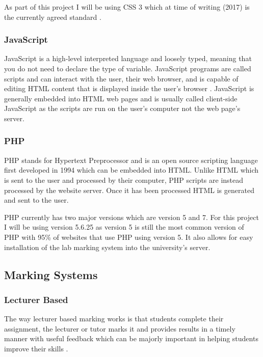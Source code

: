 \documentclass[12pt]{article}  %
\begin{document}
As part of this project I will be using CSS 3 which at time of writing (2017) is the currently agreed standard \cite{noauthor_css_nodate}.


\subsubsection{JavaScript}

JavaScript is a high-level interpreted language and loosely typed, meaning that you do not need to declare the type of  variable. JavaScript programs are called scripts and can interact with the user, their web browser, and is capable of editing HTML content that is displayed inside the user's browser \cite{flanagan_javascript:_2006}. JavaScript is generally embedded into HTML web pages and is usually called client-side JavaScript as the scripts are run on the user's computer not the web page's server.



\subsubsection{PHP}
\label{sec:php}

PHP stands for Hypertext Preprocessor and is an open source scripting language first developed in 1994 \cite{noauthor_php:_nodate} which can be embedded into HTML. Unlike HTML which is sent to the user and processed by their computer, PHP scripts are instead processed by the website server. Once it has been processed HTML is generated and sent to the user. 

PHP currently has two major versions which are version 5 and 7. For this project I will be using version 5.6.25 as version 5 is still the most common version of PHP \cite{noauthor_usage_nodate} with 95\% of websites that use PHP using version 5. It also allows for easy installation of the lab marking system into the university's server.



\subsection{Marking Systems}

\subsubsection{Lecturer Based}
The way lecturer based marking works is that students complete their assignment, the lecturer or tutor marks it and provides results in a timely manner with useful feedback which can be majorly important in helping students improve their skills  \cite{tang_investigating_2011}.
\end{document}
